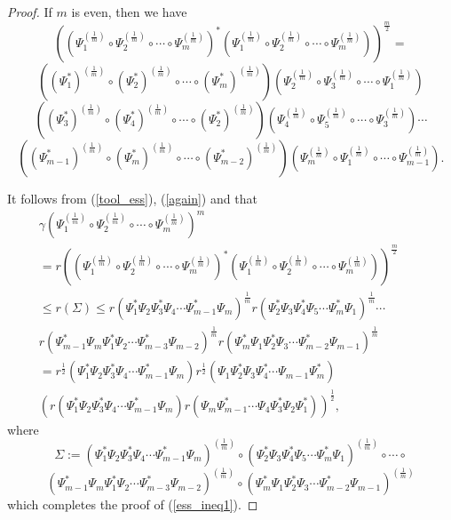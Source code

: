 \documentclass[12pt, reqno]{amsart}
\theoremstyle{definition}
\theoremstyle{remark}
\numberwithin{equation}{section}
\begin{document}
\begin{proof}
  If $m$ is even, then we have
$$\left(\left(\Psi_1^{(\frac{1}{m})}\circ\Psi_2^{(\frac{1}{m})}\circ\cdots\circ\Psi_m^{(\frac{1}{m})}\right)^*\left(\Psi_1^{(\frac{1}{m})}\circ\Psi_2^{(\frac{1}{m})}\circ\cdots\circ\Psi_m^{(\frac{1}{m})}\right)\right)^{\frac{m}{2}}=$$
$$\left((\Psi_1^*)^{(\frac{1}{m})}\circ(\Psi_2^*)^{(\frac{1}{m})}\circ\cdots\circ(\Psi_m^*)^{(\frac{1}{m})}\right)\left(\Psi_2^{(\frac{1}{m})}\circ\Psi_3^{(\frac{1}{m})}\circ\cdots\circ\Psi_1^{(\frac{1}{m})}\right)$$
$$\left((\Psi_3^*)^{(\frac{1}{m})}\circ(\Psi_4^*)^{(\frac{1}{m})}\circ\cdots\circ(\Psi_2^*)^{(\frac{1}{m})}\right)\left(\Psi_4^{(\frac{1}{m})}\circ\Psi_5^{(\frac{1}{m})}\circ\cdots\circ\Psi_3^{(\frac{1}{m})}\right)\cdots$$
$$\left((\Psi_{m-1}^*)^{(\frac{1}{m})}\circ(\Psi_m^*)^{(\frac{1}{m})}\circ\cdots\circ(\Psi_{m-2}^*)^{(\frac{1}{m})}\right)\left(\Psi_m^{(\frac{1}{m})}\circ\Psi_1^{(\frac{1}{m})}\circ\cdots\circ\Psi_{m-1}^{(\frac{1}{m})}\right).$$

It follows from (\ref{tool_ess}), (\ref{again}) and \cite[Theorem 3.2(i)]{BP22b} that
\begin{align}
\nonumber
\gamma (\Psi_1^{(\frac{1}{m})}\circ\Psi_2^{(\frac{1}{m})}\circ\cdots\circ\Psi_m^{(\frac{1}{m})})^{m}\;\;\;\;\;\;\;\;\;\;\;\;\;\;\;\;\;\;\;\;\;\;\;\;\;\;\;\;\;\;\;\;\;\;\;\;\;\;\;\;\;\;\;\;\;\;\;\;\;\;\;\;\;\;\;\;\;\;\;\;\;\;\;\\
\nonumber
=r\left(\left(\Psi_1^{(\frac{1}{m})}\circ\Psi_2^{(\frac{1}{m})}\circ\cdots\circ\Psi_m^{(\frac{1}{m})}\right)^*\left(\Psi_1^{(\frac{1}{m})}\circ\Psi_2^{(\frac{1}{m})}\circ\cdots\circ\Psi_m^{(\frac{1}{m})}\right)\right)^{\frac{m}{2}}\;\;\;\;\\
\label{vmesna1}
\le r(\Sigma)\le r(\Psi_1^*\Psi_2\Psi_3^*\Psi_4\cdots\Psi_{m-1}^*\Psi_m)^{\frac{1}{m}}r(\Psi_2^*\Psi_3\Psi_4^*\Psi_5\cdots\Psi_m^*\Psi_1)^{\frac{1}{m}}\cdots\\
\nonumber
r(\Psi_{m-1}^*\Psi_m\Psi_1^*\Psi_2\cdots\Psi_{m-3}^*\Psi_{m-2})^{\frac{1}{m}}r(\Psi_m^*\Psi_1\Psi_2^*\Psi_3\cdots\Psi_{m-2}^*\Psi_{m-1})^{\frac{1}{m}}\;\;\;\\
\nonumber
=r^{\frac{1}{2}}(\Psi_1^*\Psi_2\Psi_3^*\Psi_4\cdots\Psi_{m-1}^*\Psi_m)r^{\frac{1}{2}}(\Psi_1\Psi_2^*\Psi_3\Psi_4^*\cdots\Psi_{m-1}\Psi_m^*)\;\;\;\;\;\;\;\;\;\;\;\;\;\;\\
\nonumber
(r(\Psi_1^*\Psi_2\Psi_3^*\Psi_4\cdots\Psi_{m-1}^*\Psi_m)r(\Psi_m\Psi_{m-1}^*\cdots\Psi_4\Psi_3^*\Psi_2\Psi_1^*))^{\frac{1}{2}},\;\;\;\;\;\;\;\;\;\;\;\;\;\;\;\;\;
\end{align}
where 
$$\Sigma:=(\Psi_1^*\Psi_2\Psi_3^*\Psi_4\cdots\Psi_{m-1}^*\Psi_m)^{(\frac{1}{m})}\circ(\Psi_2^*\Psi_3\Psi_4^*\Psi_5\cdots\Psi_m^*\Psi_1)^{(\frac{1}{m})}\circ\cdots\circ$$
$$(\Psi_{m-1}^*\Psi_m\Psi_1^*\Psi_2\cdots\Psi_{m-3}^*\Psi_{m-2})^{(\frac{1}{m})}\circ(\Psi_m^*\Psi_1\Psi_2^*\Psi_3\cdots\Psi_{m-2}^*\Psi_{m-1})^{(\frac{1}{m})}$$
which completes the proof of (\ref{ess_ineq1}).


\end{proof}
\end{document}

